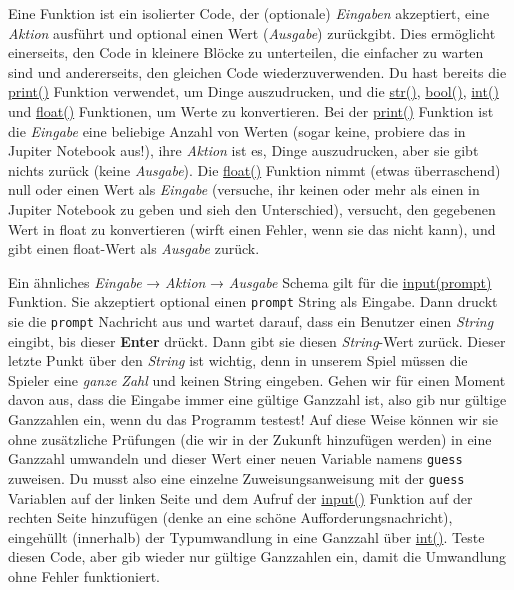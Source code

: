 \documentclass[
]{book}
\begin{document}
Eine Funktion ist ein isolierter Code, der (optionale) \emph{Eingaben} akzeptiert, eine \emph{Aktion} ausführt und optional einen Wert (\emph{Ausgabe}) zurückgibt. Dies ermöglicht einerseits, den Code in kleinere Blöcke zu unterteilen, die einfacher zu warten sind und andererseits, den gleichen Code wiederzuverwenden. Du hast bereits die \href{https://docs.python.org/3/library/functions.html\#print}{print()} Funktion verwendet, um Dinge auszudrucken, und die \href{https://docs.python.org/3/library/functions.html\#func-str}{str()}, \href{https://docs.python.org/3/library/functions.html\#bool}{bool()}, \href{https://docs.python.org/3/library/functions.html\#int}{int()} und \href{https://docs.python.org/3/library/functions.html\#float}{float()} Funktionen, um Werte zu konvertieren. Bei der \href{https://docs.python.org/3/library/functions.html\#print}{print()} Funktion ist die \emph{Eingabe} eine beliebige Anzahl von Werten (sogar keine, probiere das in Jupiter Notebook aus!), ihre \emph{Aktion} ist es, Dinge auszudrucken, aber sie gibt nichts zurück (keine \emph{Ausgabe}). Die \href{https://docs.python.org/3/library/functions.html\#float}{float()} Funktion nimmt (etwas überraschend) null oder einen Wert als \emph{Eingabe} (versuche, ihr keinen oder mehr als einen in Jupiter Notebook zu geben und sieh den Unterschied), versucht, den gegebenen Wert in float zu konvertieren (wirft einen Fehler, wenn sie das nicht kann), und gibt einen float-Wert als \emph{Ausgabe} zurück.

Ein ähnliches \emph{Eingabe} → \emph{Aktion} → \emph{Ausgabe} Schema gilt für die \href{https://docs.python.org/3/library/functions.html\#input}{input(prompt)} Funktion. Sie akzeptiert optional einen \texttt{prompt} String als Eingabe. Dann druckt sie die \texttt{prompt} Nachricht aus und wartet darauf, dass ein Benutzer einen \emph{String} eingibt, bis dieser \textbf{Enter} drückt. Dann gibt sie diesen \emph{String}-Wert zurück. Dieser letzte Punkt über den \emph{String} ist wichtig, denn in unserem Spiel müssen die Spieler eine \emph{ganze Zahl} und keinen String eingeben. Gehen wir für einen Moment davon aus, dass die Eingabe immer eine gültige Ganzzahl ist, also gib nur gültige Ganzzahlen ein, wenn du das Programm testest! Auf diese Weise können wir sie ohne zusätzliche Prüfungen (die wir in der Zukunft hinzufügen werden) in eine Ganzzahl umwandeln und dieser Wert einer neuen Variable namens \texttt{guess} zuweisen. Du musst also eine einzelne Zuweisungsanweisung mit der \texttt{guess} Variablen auf der linken Seite und dem Aufruf der \href{https://docs.python.org/3/library/functions.html\#input}{input()} Funktion auf der rechten Seite hinzufügen (denke an eine schöne Aufforderungsnachricht), eingehüllt (innerhalb) der Typumwandlung in eine Ganzzahl über \href{https://docs.python.org/3/library/functions.html\#int}{int()}. Teste diesen Code, aber gib wieder nur gültige Ganzzahlen ein, damit die Umwandlung ohne Fehler funktioniert.
\end{document}
